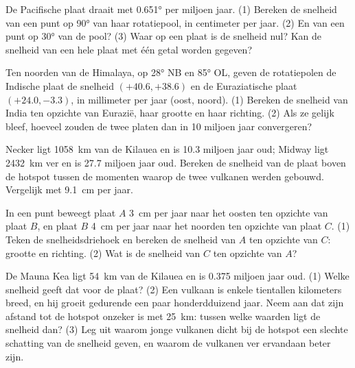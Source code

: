 \begin{exercise}[$\star\star$]\label{exo:g11:plate-motions:8}
De Pacifische plaat draait met \ang{0.651} per miljoen jaar. (1) Bereken de snelheid
van een punt op \ang{90} van haar rotatiepool, in centimeter per jaar. (2) En van
een punt op \ang{30} van de pool? (3) Waar op een plaat is de snelheid nul? Kan
de snelheid van een hele plaat met één getal worden gegeven?
\end{exercise}

\begin{exercise}[$\star\star$]\label{exo:g11:plate-motions:9}
Ten noorden van de Himalaya, op \ang{28} NB en \ang{85} OL, geven de rotatiepolen
de Indische plaat de snelheid $(+40.6, +38.6)$ en de Euraziatische plaat
$(+24.0, -3.3)$, in millimeter per jaar (oost, noord). (1) Bereken de snelheid van
India ten opzichte van Eurazië, haar grootte en haar richting. (2) Als ze gelijk
bleef, hoeveel zouden de twee platen dan in 10 miljoen jaar convergeren?
\end{exercise}

\begin{exercise}[$\star\star$]\label{exo:g11:plate-motions:10}
Necker ligt \qty{1058}{km} van de Kilauea en is \num{10.3} miljoen jaar oud;
Midway ligt \qty{2432}{km} ver en is \num{27.7} miljoen jaar oud. Bereken de
snelheid van de plaat boven de hotspot tussen de momenten waarop de twee vulkanen
werden gebouwd. Vergelijk met \qty{9.1}{cm} per jaar.
\end{exercise}

\begin{exercise}[$\star\star$]\label{exo:g11:plate-motions:11}
In een punt beweegt plaat $A$ \qty{3}{cm} per jaar naar het oosten ten opzichte van plaat $B$,
en plaat $B$ \qty{4}{cm} per jaar naar het noorden ten opzichte van plaat $C$.
(1) Teken de snelheidsdriehoek en bereken de snelheid van $A$ ten opzichte van $C$:
grootte en richting. (2) Wat is de snelheid van $C$ ten opzichte van $A$?
\end{exercise}

\begin{exercise}[$\star\star\star$]\label{exo:g11:plate-motions:12}
De Mauna Kea ligt \qty{54}{km} van de Kilauea en is \num{0.375} miljoen jaar
oud. (1) Welke snelheid geeft dat voor de plaat? (2) Een vulkaan is enkele tientallen
kilometers breed, en hij groeit gedurende een paar honderdduizend jaar. Neem aan
dat zijn afstand tot de hotspot onzeker is met \qty{25}{km}: tussen welke
waarden ligt de snelheid dan? (3) Leg uit waarom jonge vulkanen dicht bij de
hotspot een slechte schatting van de snelheid geven, en waarom de vulkanen ver ervandaan
beter zijn.
\end{exercise}

